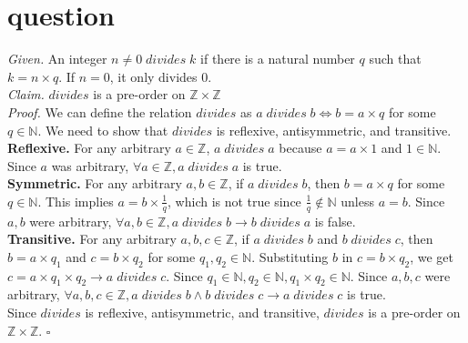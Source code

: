 \documentclass[11pt]{article}
\begin{document}
\section{question}
\emph{Given. } An integer $n \neq 0 \; divides \; k$ if there is a natural number $q$ such that $k = n \times q$. If $n = 0$, it only divides 0. \medskip \\
\emph{Claim. } $divides$ is a pre-order on $\mathbb{Z} \times \mathbb{Z}$
\medskip \\
\emph{Proof. } We can define the relation $divides$ as $a \; divides \; b \iff b = a \times q$ for some $q \in \mathbb{N}$. We need to show that $divides$ is reflexive, antisymmetric, and transitive. \\
\textbf{Reflexive. } For any arbitrary $a \in \mathbb{Z}$, $a \; divides \; a$ because $a = a \times 1$ and $1 \in \mathbb{N}$. Since $a$ was arbitrary, $\forall a \in \mathbb{Z}, a \; divides \; a$ is true. \\
\textbf{Symmetric. } For any arbitrary $a, b \in \mathbb{Z}$, if $a \; divides \; b$, then $b = a \times q$ for some $q \in \mathbb{N}$. This implies $a = b \times \frac{1}{q}$, which is not true since $\frac{1}{q} \notin \mathbb{N}$ unless $a=b$. Since $a, b$ were arbitrary, $\forall a, b \in \mathbb{Z}, a \; divides \; b \rightarrow b \; divides \; a$ is false. \\
\textbf{Transitive. } For any arbitrary $a, b, c \in \mathbb{Z}$, if $a \; divides \; b$ and $b \; divides \; c$, then $b = a \times q_1$ and $c = b \times q_2$ for some $q_1, q_2 \in \mathbb{N}$. Substituting $b$ in $c = b \times q_2$, we get $c = a \times q_1 \times q_2 \to a \; divides \; c$. Since $q_1 \in \mathbb{N}, q_2 \in \mathbb{N}, q_1 \times q_2 \in \mathbb{N}$. Since $a, b, c$ were arbitrary, $\forall a, b, c \in \mathbb{Z}, a \; divides \; b \land b \; divides \; c \rightarrow a \; divides \; c$ is true. \\
Since $divides$ is reflexive, antisymmetric, and transitive, $divides$ is a pre-order on $\mathbb{Z} \times \mathbb{Z}$. \hfill $\square$
\end{document}
